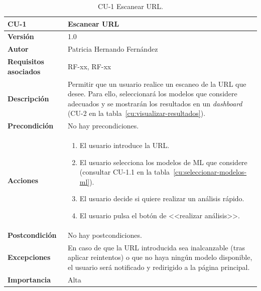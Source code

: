 \begin{table}[p]
	\centering
	\begin{tabularx}{\linewidth}{ p{} p{} }
		\toprule
		\textbf{CU-1}    & \textbf{Escanear URL}\\
		\toprule
		\textbf{Versión}              & 1.0    \\
		\textbf{Autor}                & Patricia Hernando Fernández \\
		\textbf{Requisitos asociados} & RF-xx, RF-xx \\
		\textbf{Descripción}          & Permitir que un usuario realice un escaneo de la URL que desee. Para ello, seleccionará los modelos que considere adecuados y se mostrarán los resultados en un \textit{dashboard} (CU-2 en la tabla~\ref{cu:visualizar-resultados}). \\
		\textbf{Precondición}         & No hay precondiciones. \\
		\textbf{Acciones}             &
		\begin{enumerate}
			\def\labelenumi{\arabic{enumi}.}
			\tightlist
			\item El usuario introduce la URL.
			\item El usuario selecciona los modelos de ML que considere (consultar CU-1.1 en la tabla~\ref{cu:seleccionar-modelos-ml}).
			\item El usuario decide si quiere realizar un análisis rápido.
			\item El usuario pulsa el botón de <<realizar análisis>>.
		\end{enumerate}\\
		\textbf{Postcondición}        & No hay postcondiciones. \\
		\textbf{Excepciones}          & En caso de que la URL introducida sea inalcanzable (tras aplicar reintentos) o que no haya ningún modelo disponible, el usuario será notificado y redirigido a la página principal. \\
		\textbf{Importancia}          & Alta \\
		\bottomrule
	\end{tabularx}
	\caption{CU-1 Escanear URL.}
	\label{cu:escanear-url}
\end{table}


